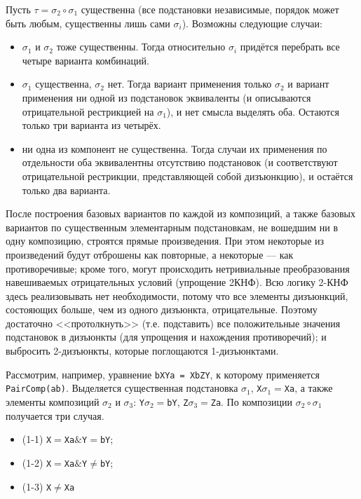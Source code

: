\documentclass[12pt]{article}
\def\logand{\mathrel{\&}}
\begin{document}
Пусть $\tau = \sigma_2 \circ \sigma_1$ существенна (все подстановки независимые, порядок может быть любым, существенны лишь сами $\sigma_i$). Возможны следующие случаи:

\begin{itemize}
\item $\sigma_1$ и $\sigma_2$ тоже существенны. Тогда относительно $\sigma_i$ придётся перебрать все четыре варианта комбинаций.
\item $\sigma_1$ существенна, $\sigma_2$ нет. Тогда вариант применения только $\sigma_2$ и вариант применения ни одной из подстановок эквиваленты (и описываются отрицательной рестрикцией на $\sigma_1$), и нет смысла выделять оба. Остаются только три варианта из четырёх.
\item ни одна из компонент не существенна. Тогда случаи их применения по отдельности оба эквивалентны отсутствию подстановок (и соответствуют отрицательной рестрикции, представляющей собой дизъюнкцию), и остаётся только два варианта.  
\end{itemize}

После построения базовых вариантов по каждой из композиций, а также базовых вариантов по существенным элементарным подстановкам, не вошедшим ни в одну композицию, строятся прямые произведения. При этом некоторые из произведений будут отброшены как повторные, а некоторые --- как противоречивые; кроме того, могут происходить нетривиальные преобразования навешиваемых отрицательных условий (упрощение 2КНФ). Всю логику 2-КНФ здесь реализовывать нет необходимости, потому что все элементы дизъюнкций, состояющих больше, чем из одного дизъюнкта, отрицательные. Поэтому достаточно <<протолкнуть>> (т.е. подставить) все положительные значения подстановок в дизъюнкты (для упрощения и нахождения противоречий); и выбросить 2-дизъюнкты, которые поглощаются 1-дизъюнктами.

Рассмотрим, например, уравнение \verb|bXYa = XbZY|, к которому применяется \verb|PairComp(ab)|. Выделяется существенная подстановка $\sigma_1$, \verb|X|$\sigma_1=$\verb|Xa|, а также элементы композиций $\sigma_2$ и $\sigma_3$: \verb|Y|$\sigma_2=$\verb|bY|, \verb|Z|$\sigma_3=$\verb|Za|. По композиции $\sigma_2\circ\sigma_1$ получается три случая.

\begin{itemize}
\item (1-1) \verb|X|$=$\verb|Xa|$\logand$\verb|Y|$=$\verb|bY|;
\item (1-2) \verb|X|$=$\verb|Xa|$\logand$\verb|Y|$\neq$\verb|bY|;
\item (1-3) \verb|X|$\neq$\verb|Xa|
\end{itemize}  
 
\end{document}
